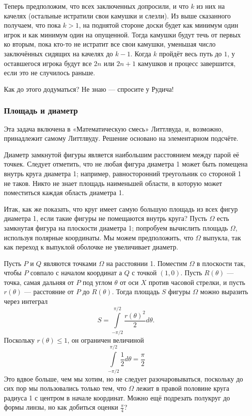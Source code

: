Теперь предположим, что всех заключенных допросили, и что $k$ из них на качелях (остальные истратили свои камушки и слезли).
Из выше сказанного получаем, что пока $k>1$, на поднятой стороне доски будет как минимум один игрок и как минимум один на опущенной.
Тогда камушки будут течь от первых ко вторым, пока кто-то не истратит все свои камушки, уменьшая число заключённых сидящих на качелях до $k-1$.
Когда $k$ пройдёт весь путь до $1$, у оставшегося игрока будут все $2n$ или $2n+1$ камушков и процесс завершится, если это не случилось раньше.
\heart

Как до этого додуматься?
Не  знаю --- спросите у Рудича!

\subsubsection*{Площадь и диаметр}

Эта задача включена в «Математическую смесь» Литтлвуда, и, возможно, принадлежит самому Литтлвуду.
Решение основано на элементарном подсчёте. %

Диаметр замкнутой фигуры является наибольшим расстоянием между парой её точкек.
Следует отметить, что не любая фигура диаметра 1 может быть помещена внутрь круга диаметра 1;
например, равносторонний треугольник со стороной 1 не таков.
Никто не знает площадь наименьшей области, в которую может поместиться каждая область диаметра 1. %

Итак, как же показать, что круг имеет самую большую площадь из всех фигур диаметра 1, если такие фигуры не помещаются внутрь круга?
Пусть $\Omega$ есть замкнутая фигура на плоскости диаметра 1; попробуем вычислить площадь $\Omega$, используя полярные координаты.
Мы можем предположить, что $\Omega$ выпукла, так как переход к выпуклой оболочке не увеличивает диаметр.


Пусть $P$ и $Q$ являются точками $\Omega$ на расстоянии 1.
Поместим $\Omega$ в плоскости так, чтобы $P$ совпало с началом координат а $Q$ с точкой $(1,0)$.
Пусть $R(\theta)$ --- точка, самая дальняя от $P$ под углом $\theta$ от оси $X$ против часовой стрелки, и пусть $r(\theta)$ --- расстояние от $P$ до $R(\theta)$.
Тогда площадь $S$ фигуры $\Omega$ можно выразить через интеграл
\[S=\int\limits_{-\pi/2}^{\pi/2}\frac{r(\theta)^2}{2}d\theta.\]
Поскольку $r(\theta) \le 1$, он ограничен величиной
\[\int\limits_{-\pi/2}^{\pi/2}\frac{1}{2}d\theta=\frac\pi2\]
Это вдвое больше, чем мы хотим, но не следует разочаровываться, поскольку до сих пор мы пользовались только тем, что $\Omega$ лежит в правой половине круга радиуса 1 с центром в начале координат.
Можно ещё подрезать полукруг до формы линзы, но как добиться оценки $\tfrac\pi4$?

